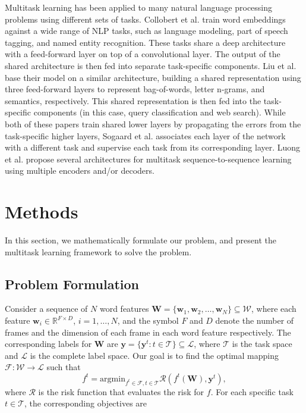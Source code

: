 \documentclass{article}
\begin{document}
Multitask learning has been applied to many natural language processing problems using different sets of tasks. Collobert et al. \citep{collobert2008unified} train word embeddings against a wide range of NLP tasks, such as language modeling, part of speech tagging, and named entity recognition. These tasks share a deep architecture with a feed-forward layer on top of a convolutional layer. The output of the shared architecture is then fed into separate task-specific components. Liu et al. \citep{liu2015representation} base their model on a similar architecture, building a shared representation using three feed-forward layers to represent bag-of-words, letter n-grams, and semantics, respectively.  This shared representation is then fed into the task-specific components (in this case, query classification and web search). While both of these papers train shared lower layers by propagating the errors from the task-specific higher layers, Sogaard et al. \citep{sogaard2016deep} associates each layer of the network with a different task and supervise each task from its corresponding layer. Luong et al. \citep{luong2015multi} propose several architectures for multitask sequence-to-sequence learning using multiple encoders and/or decoders.

\section{Methods}
In this section, we mathematically formulate our problem, and present the multitask learning framework to solve the problem.
\subsection{Problem Formulation}
Consider a sequence of $N$ word features
$\mathbf{W} = \{ \mathbf{w}_1, \mathbf{w}_2, \ldots, \mathbf{w}_N \} \subseteq \mathcal{W}$, where each feature $\mathbf{w}_i \in \mathbb{R}^{F \times D}$, $i=1,\ldots,N$, and the symbol $F$ and $D$ denote the number of frames and the dimension of each frame in each word feature respectively. The corresponding labels for $\mathbf{W}$ are $\mathbf{y} = \{\mathbf{y}^t: t \in \mathcal{T} \}\subseteq \mathcal{L}$, where $\mathcal{T}$ is the task space and $\mathcal{L}$ is the complete label space. Our goal is to find the optimal mapping $\mathcal{F}: \mathcal{W} \to \mathcal{L}$ such that
\begin{equation}
f^t = \mathrm{argmin}_{f^t \in \mathcal{F}, t \in \mathcal{T}} \mathcal{R}(f^t(\mathbf{W}), \mathbf{y}^t),
\end{equation}
where $\mathcal{R}$ is the risk function that evaluates the risk for $f$. For each specific task $t \in \mathcal{T}$, the corresponding objectives are
\end{document}
